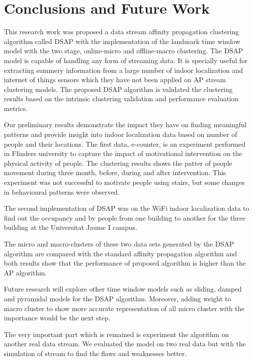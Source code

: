 \setlength{\parindent}{2em}

% 
\chapter{Conclusions and Future Work}

This research work was proposed a data stream affinity propagation clustering algorithm called DSAP with the implementation of the landmark time window model with the two stage, online-micro and offline-macro clustering. The DSAP model is capable of handling any form of streaming data. It is specially useful for extracting summery information from a large number of indoor localization and internet of things sensors which they have not been applied on AP stream clustering models.
The proposed DSAP algorithm is validated the clustering results based on the intrinsic clustering validation and performance evaluation metrics.  

Our preliminary results demonstrate the impact they have on finding meaningful patterns and provide insight into indoor localization data based on number of people and their locations. The first data, e-counter, is an experiment performed in Flinders university to capture the impact of motivational intervention on the physical activity of people. The clustering results shows the patter of people movement during three month, before, during and after intervention. This experiment was not successful to motivate people using stairs, but some changes in behavioural patterns were observed. 

The second implementation of DSAP was on the WiFi indoor localization data to find out the occupancy and by people from one building to another for the three building at the Universitat Jaume I campus.

The micro and macro-clusters of these two data sets generated by the DSAP algorithm are compared with the standard affinity propagation algorithm and both results show that the performance of proposed algorithm is higher than the AP algorithm.

Future research will explore other time window models such as sliding, damped and pyramidal models for the DSAP algorithm. Moreover, adding weight to macro cluster to show more accurate representation of all micro cluster with the importance would be the next step.  

The very important part which is remained is experiment the algorithm on another real data stream. We evaluated the model on two real data but with the simulation of stream to find the flaws and weaknesses better.

